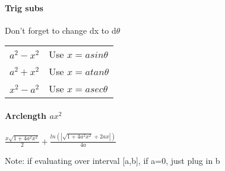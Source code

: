 \documentclass[10pt,landscape]{article}
\begin{document}
\begin{multicols}{4}
\paragraph{Trig subs}
Don't forget to change dx to d$\theta$

\begin{tabular}{l l}
$a^2-x^2$ & Use $x=asin\theta$ \\
$a^2+x^2$ & Use $x=atan\theta$ \\
$x^2-a^2$ & Use $x=asec\theta$
\end{tabular}

\paragraph{Arclength $ax^2$}
$\frac{x\sqrt{1+4a^2x^2}}{2} + \frac{ln(|\sqrt{1+4a^2x^2}+2ax|)}{4a}$

Note: if evaluating over interval [a,b], if a=0, just plug in b
		
	\end{multicols}
\end{document}
